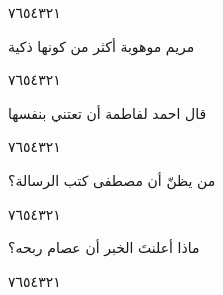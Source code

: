 \documentclass[11pt, a4paper]{article}
\begin{document}
{\begin{center}
        \hfill\textarabic{٧}\hfill\textarabic{٦}\hfill\textarabic{٥}\hfill\textarabic{٤}\hfill\textarabic{٣}\hfill\textarabic{٢}\hfill\textarabic{١}
        \end{center}


\vspace{0.5\baselineskip}\begin{flushright}
\textarabic{مريم موهوبة أكثر من كونها ذكية}
\end{flushright}

\begin{center}
        \hfill\textarabic{٧}\hfill\textarabic{٦}\hfill\textarabic{٥}\hfill\textarabic{٤}\hfill\textarabic{٣}\hfill\textarabic{٢}\hfill\textarabic{١}
        \end{center}


\vspace{0.5\baselineskip}\begin{flushright}
\textarabic{قال احمد لفاطمة أن تعتني بنفسها}
\end{flushright}

\begin{center}
        \hfill\textarabic{٧}\hfill\textarabic{٦}\hfill\textarabic{٥}\hfill\textarabic{٤}\hfill\textarabic{٣}\hfill\textarabic{٢}\hfill\textarabic{١}
        \end{center}


\vspace{0.5\baselineskip}\begin{flushright}
\textarabic{من يظنّ أن مصطفى كتب الرسالة؟}
\end{flushright}

\begin{center}
        \hfill\textarabic{٧}\hfill\textarabic{٦}\hfill\textarabic{٥}\hfill\textarabic{٤}\hfill\textarabic{٣}\hfill\textarabic{٢}\hfill\textarabic{١}
        \end{center}


\vspace{0.5\baselineskip}\begin{flushright}
\textarabic{ماذا أعلنتَ الخبر أن عصام ربحه؟}
\end{flushright}

\begin{center}
        \hfill\textarabic{٧}\hfill\textarabic{٦}\hfill\textarabic{٥}\hfill\textarabic{٤}\hfill\textarabic{٣}\hfill\textarabic{٢}\hfill\textarabic{١}
        \end{center}


}
\end{document}
